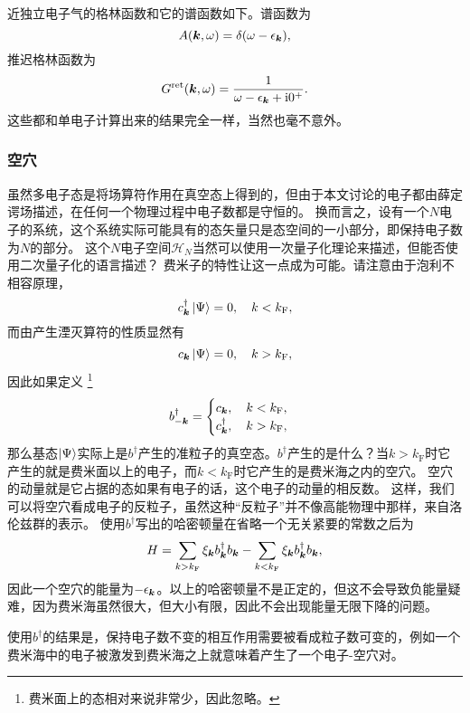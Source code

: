 近独立电子气的格林函数和它的谱函数如下。谱函数为
\begin{equation}
    A(\vb*{k}, \omega) = \delta(\omega - \epsilon_{\vb*{k}}),
\end{equation}
推迟格林函数为
\begin{equation}
    G^\text{ret}(\vb*{k}, \omega) = \frac{1}{\omega - \epsilon_{\vb*{k}} + \mathrm{i} 0^+}.
\end{equation}
这些都和单电子计算出来的结果完全一样，当然也毫不意外。

\subsubsection{空穴}

虽然多电子态是将场算符作用在真空态上得到的，但由于本文讨论的电子都由薛定谔场描述，在任何一个物理过程中电子数都是守恒的。
换而言之，设有一个$N$电子的系统，这个系统实际可能具有的态矢量只是态空间的一小部分，即保持电子数为$N$的部分。
这个$N$电子空间$\mathcal{H}_N$当然可以使用一次量子化理论来描述，但能否使用二次量子化的语言描述？
费米子的特性让这一点成为可能。请注意由于泡利不相容原理，
\[
    {c}^\dagger_{\vb*{k}} \ket{\Psi} = 0, \quad k < k_\text{F},
\]
而由产生湮灭算符的性质显然有
\[
    {c}_{\vb*{k}} \ket{\Psi} = 0, \quad k > k_\text{F},
\]
因此如果定义%
\footnote{费米面上的态相对来说非常少，因此忽略。}%
\begin{equation}
    {b}^\dagger_{-\vb*{k}} = \begin{cases}
        {c}_{\vb*{k}}, \quad k < k_\text{F}, \\
        {c}_{\vb*{k}}^\dagger, \quad k > k_\text{F},
    \end{cases}
\end{equation}
那么基态$\ket{\Psi}$实际上是${b}^\dagger$产生的准粒子的真空态。${b}^\dagger$产生的是什么？当$k>k_\text{F}$时它产生的就是费米面以上的电子，而$k<k_\text{F}$时它产生的是费米海之内的空穴。
空穴的动量就是它占据的态如果有电子的话，这个电子的动量的相反数。
这样，我们可以将空穴看成电子的反粒子，虽然这种“反粒子”并不像高能物理中那样，来自洛伦兹群的表示。
使用${b}^\dagger$写出的哈密顿量在省略一个无关紧要的常数之后为
\[
    {H} = \sum_{k > k_\text{F}} \xi_{\vb*{k}} {b}^\dagger_{\vb*{k}} {b}_{\vb*{k}} - \sum_{k < k_\text{F}} \xi_{\vb*{k}} {b}^\dagger_{\vb*{k}} {b}_{\vb*{k}},
\]
因此一个空穴的能量为$-\epsilon_{\vb*{k}}$。以上的哈密顿量不是正定的，但这不会导致负能量疑难，因为费米海虽然很大，但大小有限，因此不会出现能量无限下降的问题。

使用${b}^\dagger$的结果是，保持电子数不变的相互作用需要被看成粒子数可变的，例如一个费米海中的电子被激发到费米海之上就意味着产生了一个电子-空穴对。

